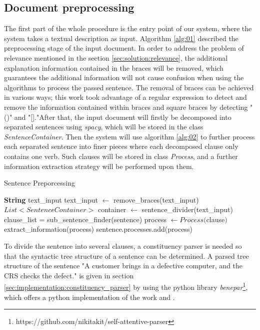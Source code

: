 \subsection{Document preprocessing}
The first part of the whole procedure is the entry point of our system, where the system takes a textual description as input. Algorithm \ref{alg:01} described the preprocessing stage of the input document. In order to address the problem of relevance mentioned in the section \ref{sec:solution:relevance}, the additional explanation information contained in the braces will be removed, which guarantees the additional information will not cause confusion when using the algorithms to process the passed sentence. The removal of braces can be achieved in various ways; this work took advantage of a regular expression to detect and remove the information contained within braces and square braces by detecting "()" and "[]."After that, the input document will firstly be decomposed into separated sentences using \textit{spacy}, which will be stored in the class \textit{SentenceContainer}. Then the system will use algorithm \ref{alg:02} to further process each separated sentence into finer pieces where each decomposed clause only contains one verb. Such clauses will be stored in class \textit{Process}, and a further information extraction strategy will be performed upon them.

\begin{algorithm}
\caption{Sentence Preporcessing}
\label{alg:01}
	\begin{algorithmic} [1]
		\REQUIRE \textbf{String} text\_input
		\STATE text\_input $\leftarrow$ remove\_braces(text\_input)
		\STATE $List<SentenceContainer>$ container $\leftarrow$ sentence\_divider(text\_input)
		\STATE clause\_list = sub\_sentence\_finder(sentence)
			\STATE process $\leftarrow Process($clause$)$
			\STATE extract\_information(process)
			\STATE sentence.processes.add(process) 
		\ENDFOR
		\ENDFOR
	\end{algorithmic}
\end{algorithm}

To divide the sentence into several clauses, a constituency parser is needed so that the syntactic tree structure of a sentence can be determined. A parsed tree structure of the sentence "A customer brings in a defective computer, and the CRS checks the defect." is given in section \ref{sec:implementation:constituency_parser} by using the python library \textit{benepar}\footnote{https://github.com/nikitakit/self-attentive-parser}, which offers a python implementation of the work \cite{constituency_parser} and \cite{constituency_parser_2}. 


